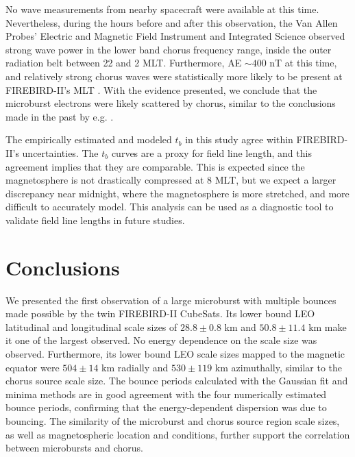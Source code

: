 \documentclass[draft, linenumbers]{agujournal}
\begin{document}
No wave measurements from nearby spacecraft were available at this time. Nevertheless, during the hours before and after this observation, the Van Allen Probes' \citep{Mauk2013} Electric and Magnetic Field Instrument and Integrated Science \citep{Kletzing2013} observed strong wave power in the lower band chorus frequency range, inside the outer radiation belt between 22 and 2 MLT. Furthermore, AE $\sim 400$ nT at this time, and relatively strong chorus waves were statistically more likely to be present at FIREBIRD-II's MLT \citep{Li2009}. With the evidence presented, we conclude that the microburst electrons were likely scattered by chorus, similar to the conclusions made in the past by e.g. \citet{Lorentzen2001a, O'Brien2003, Breneman2017}.

The empirically estimated and modeled $t_b$ in this study agree within FIREBIRD-II's uncertainties. The $t_b$ curves are a proxy for field line length, and this agreement implies that they are comparable. This is expected since the magnetosphere is not drastically compressed at 8 MLT, but we expect a larger discrepancy near midnight, where the magnetosphere is more stretched, and more difficult to accurately model. This analysis can be used as a diagnostic tool to validate field line lengths in future studies.

\section{Conclusions}
We presented the first observation of a large microburst with multiple bounces made possible by the twin FIREBIRD-II CubeSats. Its lower bound LEO latitudinal and longitudinal scale sizes of $28.8 \pm 0.8$ km and $ 50.8 \pm 11.4$  km make it one of the largest observed. No energy dependence on the scale size was observed. Furthermore, its lower bound LEO scale sizes mapped to the magnetic equator were  $504 \pm​ 14$ km radially and $530 \pm 119$ km azimuthally, similar to the chorus source scale size. The bounce periods calculated with the Gaussian fit and minima methods are in good agreement with the four numerically estimated bounce periods, confirming that the energy-dependent dispersion was due to bouncing. The similarity of the microburst and chorus source region scale sizes, as well as magnetospheric location and conditions, further support the correlation between microbursts and chorus.




\end{document}
